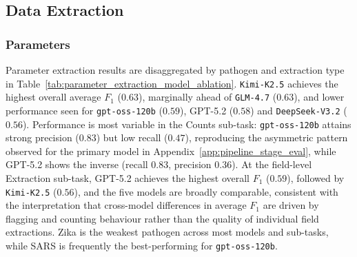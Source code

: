 \subsection{Data Extraction}
\subsubsection*{Parameters}
Parameter extraction results are disaggregated by pathogen and extraction type in Table~\ref{tab:parameter_extraction_model_ablation}. \texttt{Kimi-K2.5} achieves the highest overall average $F_1$ ($0.63$), marginally ahead of \texttt{GLM-4.7} ($0.63$), and lower performance seen for \texttt{gpt-oss-120b} ($0.59$), GPT-5.2 ($0.58$) and \texttt{DeepSeek-V3.2} ($0.56$). Performance is most variable in the Counts sub-task: \texttt{gpt-oss-120b} attains strong precision ($0.83$) but low recall ($0.47$), reproducing the asymmetric pattern observed for the primary model in Appendix~\ref{app:pipeline_stage_eval}, while GPT-5.2 shows the inverse (recall $0.83$, precision $0.36$). At the field-level Extraction sub-task, GPT-5.2 achieves the highest overall $F_1$ ($0.59$), followed by \texttt{Kimi-K2.5} ($0.56$), and the five models are broadly comparable, consistent with the interpretation that cross-model differences in average $F_1$ are driven by flagging and counting behaviour rather than the quality of individual field extractions. Zika is the weakest pathogen across most models and sub-tasks, while SARS is frequently the best-performing for \texttt{gpt-oss-120b}.


